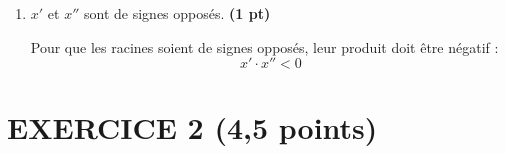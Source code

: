 \documentclass[12pt]{article}
\begin{document}
\begin{enumerate}
\begin{enumerate}
        \item $x'$ et $x''$ sont de signes opposés. \textbf{(1 pt)}
        
       Pour que les racines soient de signes opposés, leur produit doit être négatif :
       \[
        x' \cdot x'' < 0
       \]
        
        
        
        
    \end{enumerate}

    

    
\end{enumerate}

\section*{EXERCICE 2 (4,5 points)}
\end{document}
